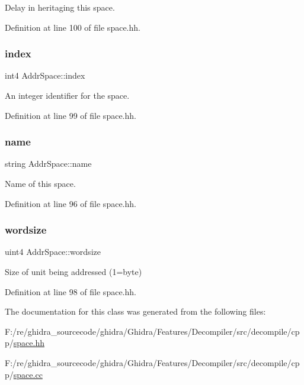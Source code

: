 Delay in heritaging this space. 



Definition at line 100 of file space.\+hh.

\mbox{\label{class_addr_space_ace333a37cd6fe6ae2c52cd9d64d7269e}} 
\subsubsection{\texorpdfstring{index}{index}}
{\footnotesize\ttfamily int4 Addr\+Space\+::index\hspace{0.3cm}{\ttfamily [protected]}}



An integer identifier for the space. 



Definition at line 99 of file space.\+hh.

\mbox{\label{class_addr_space_aa0df0a80bf601ab9e4384a36e72f0c72}} 
\subsubsection{\texorpdfstring{name}{name}}
{\footnotesize\ttfamily string Addr\+Space\+::name\hspace{0.3cm}{\ttfamily [protected]}}



Name of this space. 



Definition at line 96 of file space.\+hh.

\mbox{\label{class_addr_space_a01a3c9c83f617703abed64d7c6de849a}} 
\subsubsection{\texorpdfstring{wordsize}{wordsize}}
{\footnotesize\ttfamily uint4 Addr\+Space\+::wordsize\hspace{0.3cm}{\ttfamily [protected]}}



Size of unit being addressed (1=byte) 



Definition at line 98 of file space.\+hh.



The documentation for this class was generated from the following files\+:\begin{DoxyCompactItemize}
\item 
F\+:/re/ghidra\+\_\+sourcecode/ghidra/\+Ghidra/\+Features/\+Decompiler/src/decompile/cpp/\mbox{\hyperlink{space_8hh}{space.\+hh}}\item 
F\+:/re/ghidra\+\_\+sourcecode/ghidra/\+Ghidra/\+Features/\+Decompiler/src/decompile/cpp/\mbox{\hyperlink{space_8cc}{space.\+cc}}\end{DoxyCompactItemize}
